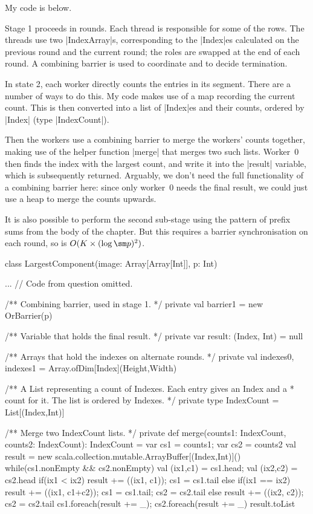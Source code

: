 \begin{answer}
My code is below.  

Stage 1 proceeds in rounds.  Each thread is responsible for some of the rows.
The threads use two |IndexArray|s, corresponding to the |Index|es calculated
on the previous round and the current round; the roles are swapped at the end
of each round.  A combining barrier is used to coordinate and to decide
termination.

In state 2, each worker directly counts the entries in its segment.  There are
a number of ways to do this.  My code makes use of a map recording the current
count.  This is then converted into a list of |Index|es and their counts,
ordered by |Index| (type |IndexCount|).

Then the workers use a combining barrier to merge the workers' counts
together, making use of the helper function |merge| that merges two such
lists.  Worker~0 then finds the index with the largest count, and write it
into the |result| variable, which is subsequently returned.  Arguably, we
don't need the full functionality of a combining barrier here: since only
worker~0 needs the final result, we could just use a heap to merge the counts
upwards. 

It is also possible to perform the second sub-stage using the pattern of
prefix sums from the body of the chapter.  But this requires a barrier
synchronisation on each round, so is  $O(K \times (\log \sm p)^2)$.



\begin{scala}
class LargestComponent(image: Array[Array[Int]], p: Int){
  ... // Code from question omitted. 

  /** Combining barrier, used in stage 1. */
  private val barrier1 = new OrBarrier(p)

  /** Variable that holds the final result. */
  private var result: (Index, Int) = null

  /** Arrays that hold the indexes on alternate rounds. */
  private val indexes0, indexes1 = Array.ofDim[Index](Height,Width)

  /** A List representing a count of Indexes.  Each entry gives an Index and a
    * count for it.  The list is ordered by Indexes. */
  private type IndexCount = List[(Index,Int)]

  /** Merge two IndexCount lists. */
  private def merge(counts1: IndexCount, counts2: IndexCount): IndexCount = {
    var cs1 = counts1; var cs2 = counts2
    val result = new scala.collection.mutable.ArrayBuffer[(Index,Int)]()
    while(cs1.nonEmpty && cs2.nonEmpty){
      val (ix1,c1) = cs1.head; val (ix2,c2) = cs2.head
      if(ix1 < ix2){ result += ((ix1, c1)); cs1 = cs1.tail }
      else if(ix1 == ix2){ 
        result += ((ix1, c1+c2)); cs1 = cs1.tail; cs2 = cs2.tail 
      }
      else{ result += ((ix2, c2)); cs2 = cs2.tail }
    }
    cs1.foreach(result += _); cs2.foreach(result += _)
    result.toList
  }

}
\end{scala}
\end{answer}
